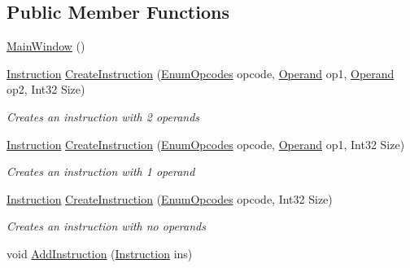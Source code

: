 \subsection*{Public Member Functions}
\begin{DoxyCompactItemize}
\item 
\hyperlink{class_c_p_u___o_s___simulator_1_1_main_window_a33462505a86657583c1560cbf02172bd}{Main\+Window} ()
\item 
\hyperlink{class_c_p_u___o_s___simulator_1_1_c_p_u_1_1_instruction}{Instruction} \hyperlink{class_c_p_u___o_s___simulator_1_1_main_window_a0786a3f7a368c6e63f6e49bc70d3083d}{Create\+Instruction} (\hyperlink{namespace_c_p_u___o_s___simulator_1_1_c_p_u_ac29c87bff87ad404c953b2581024043e}{Enum\+Opcodes} opcode, \hyperlink{class_c_p_u___o_s___simulator_1_1_c_p_u_1_1_operand}{Operand} op1, \hyperlink{class_c_p_u___o_s___simulator_1_1_c_p_u_1_1_operand}{Operand} op2, Int32 Size)
\begin{DoxyCompactList}\small\item\em Creates an instruction with 2 operands \end{DoxyCompactList}\item 
\hyperlink{class_c_p_u___o_s___simulator_1_1_c_p_u_1_1_instruction}{Instruction} \hyperlink{class_c_p_u___o_s___simulator_1_1_main_window_a91d73f33961d6268e741d7f2cf6a2b6d}{Create\+Instruction} (\hyperlink{namespace_c_p_u___o_s___simulator_1_1_c_p_u_ac29c87bff87ad404c953b2581024043e}{Enum\+Opcodes} opcode, \hyperlink{class_c_p_u___o_s___simulator_1_1_c_p_u_1_1_operand}{Operand} op1, Int32 Size)
\begin{DoxyCompactList}\small\item\em Creates an instruction with 1 operand \end{DoxyCompactList}\item 
\hyperlink{class_c_p_u___o_s___simulator_1_1_c_p_u_1_1_instruction}{Instruction} \hyperlink{class_c_p_u___o_s___simulator_1_1_main_window_a0616de56bcd9f57feb247f7e5de55f5f}{Create\+Instruction} (\hyperlink{namespace_c_p_u___o_s___simulator_1_1_c_p_u_ac29c87bff87ad404c953b2581024043e}{Enum\+Opcodes} opcode, Int32 Size)
\begin{DoxyCompactList}\small\item\em Creates an instruction with no operands \end{DoxyCompactList}\item 
void \hyperlink{class_c_p_u___o_s___simulator_1_1_main_window_aff4dc8e6061987daf02732e85fcd643a}{Add\+Instruction} (\hyperlink{class_c_p_u___o_s___simulator_1_1_c_p_u_1_1_instruction}{Instruction} ins)

\end{DoxyCompactItemize}
